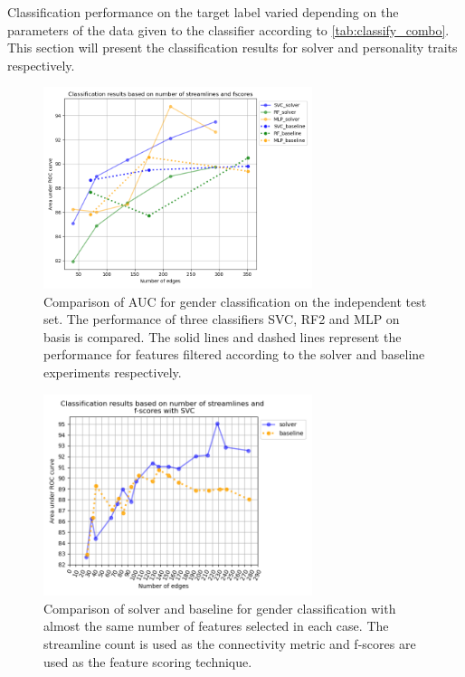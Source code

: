 \documentclass[msthesis.tex]{subfiles}
\begin{document}
Classification performance on the target label varied depending on the parameters of the data given to the classifier according to \autoref{tab:classify_combo}. This section will present the classification results for solver and personality traits respectively.
\begin{figure}[]
    \centering
    \includegraphics[height=0.5\textwidth, width=0.7\textwidth, keepaspectratio]{images/select_clf_auc_gender.png}
    \caption{Comparison of \gls{AUC} for gender classification on the independent test set. The performance of three classifiers \gls{SVC}, \gls{RF2} and \gls{MLP} on basis is compared. The solid lines and dashed lines represent the performance for features filtered according to the solver and baseline experiments respectively.}
    \label{fig:clf_solver results}
\end{figure}
\begin{figure}[]
    \centering
    \includegraphics[height=0.5\textwidth, width=0.7\textwidth, keepaspectratio]{images/select_clf_auf_gender_2_scaled.png}
    \caption{Comparison of solver and baseline for gender classification with almost the same number of features selected in each case. The streamline count is used as the connectivity metric and f-scores are used as the feature scoring technique. }
    \label{fig:svcgender}
\end{figure}
\end{document}
